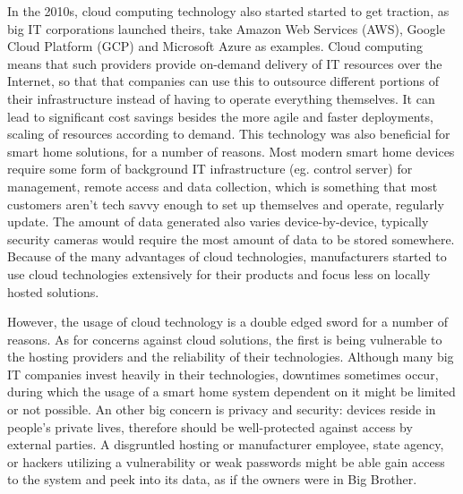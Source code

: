 In the 2010s, cloud computing technology also started started to get traction, as big IT corporations launched theirs, take Amazon Web Services (AWS), Google Cloud Platform (GCP) and Microsoft Azure as examples. Cloud computing means that such providers provide on-demand delivery of IT resources over the Internet, so that that companies can use this to outsource different portions of their infrastructure instead of having to operate everything themselves. \cite{AWScloud} It can lead to significant cost savings besides the more agile and faster deployments, scaling of resources according to demand. This technology was also beneficial for smart home solutions, for a number of reasons. \cite{ChakSHS} Most modern smart home devices require some form of background IT infrastructure (eg. control server) for management, remote access and data collection, which is something that most customers aren't tech savvy enough to set up themselves and operate, regularly update. The amount of data generated also varies device-by-device, typically security cameras would require the most amount of data to be stored somewhere. Because of the many advantages of cloud technologies, manufacturers started to use cloud technologies extensively for their products and focus less on locally hosted solutions.

However, the usage of cloud technology is a double edged sword for a number of reasons. As for concerns against cloud solutions, the first is being vulnerable to the hosting providers and the reliability of their technologies. Although many big IT companies invest heavily in their technologies, downtimes sometimes occur, during which the usage of a smart home system dependent on it might be limited or not possible. An other big concern is privacy and security: devices reside in people's private lives, therefore should be well-protected against access by external parties. A disgruntled hosting or manufacturer employee, state agency, or hackers utilizing a vulnerability or weak passwords might be able gain access to the system and peek into its data, as if the owners were in Big Brother. \cite{QACloudDisadvantages}

